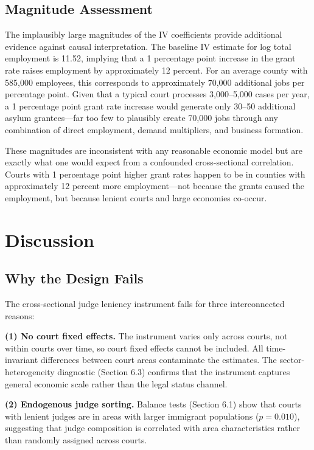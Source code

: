 \documentclass[12pt]{article}
\begin{document}
\subsection{Magnitude Assessment}

The implausibly large magnitudes of the IV coefficients provide additional evidence against causal interpretation. The baseline IV estimate for log total employment is 11.52, implying that a 1 percentage point increase in the grant rate raises employment by approximately 12 percent. For an average county with 585,000 employees, this corresponds to approximately 70,000 additional jobs per percentage point. Given that a typical court processes 3,000--5,000 cases per year, a 1 percentage point grant rate increase would generate only 30--50 additional asylum grantees---far too few to plausibly create 70,000 jobs through any combination of direct employment, demand multipliers, and business formation.

These magnitudes are inconsistent with any reasonable economic model but are exactly what one would expect from a confounded cross-sectional correlation. Courts with 1 percentage point higher grant rates happen to be in counties with approximately 12 percent more employment---not because the grants caused the employment, but because lenient courts and large economies co-occur.


\section{Discussion}

\subsection{Why the Design Fails}

The cross-sectional judge leniency instrument fails for three interconnected reasons:

\textbf{(1) No court fixed effects.} The instrument varies only across courts, not within courts over time, so court fixed effects cannot be included. All time-invariant differences between court areas contaminate the estimates. The sector-heterogeneity diagnostic (Section 6.3) confirms that the instrument captures general economic scale rather than the legal status channel.

\textbf{(2) Endogenous judge sorting.} Balance tests (Section 6.1) show that courts with lenient judges are in areas with larger immigrant populations ($p = 0.010$), suggesting that judge composition is correlated with area characteristics rather than randomly assigned across courts.
\end{document}
